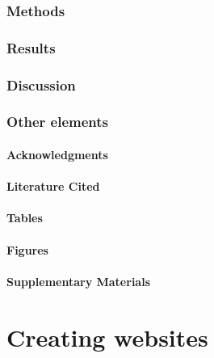 \documentclass[
]{book}
\begin{document}
\hypertarget{methods}{%
\section{Methods}\label{methods}}

\hypertarget{results}{%
\section{Results}\label{results}}

\hypertarget{discussion}{%
\section{Discussion}\label{discussion}}

\hypertarget{other-elements}{%
\section{Other elements}\label{other-elements}}

\hypertarget{acknowledgments}{%
\subsection{Acknowledgments}\label{acknowledgments}}

\hypertarget{literature-cited}{%
\subsection{Literature Cited}\label{literature-cited}}

\hypertarget{tables-2}{%
\subsection{Tables}\label{tables-2}}

\hypertarget{figures-1}{%
\subsection{Figures}\label{figures-1}}

\hypertarget{supplementary-materials}{%
\subsection{Supplementary Materials}\label{supplementary-materials}}

\hypertarget{part-creating-websites}{%
\part{Creating websites}\label{part-creating-websites}}
\end{document}
